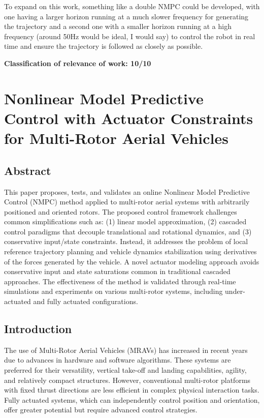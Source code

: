 \documentclass[a4paper,12pt]{article}
\begin{document}
To expand on this work, something like a double NMPC could be developed, with one having a larger horizon running at a much slower frequency for generating the trajectory and a second one with a smaller horizon running at a high frequency (around 50Hz would be ideal, I would say) to control the robot in real time and ensure the trajectory is followed as closely as possible.

\textbf{Classification of relevance of work: 10/10}

\clearpage

\section{Nonlinear Model Predictive Control with Actuator Constraints for Multi-Rotor Aerial Vehicles}

\subsection{Abstract}
This paper proposes, tests, and validates an online Nonlinear Model Predictive Control (NMPC) method applied to multi-rotor aerial systems with arbitrarily positioned and oriented rotors. The proposed control framework challenges common simplifications such as: (1) linear model approximation, (2) cascaded control paradigms that decouple translational and rotational dynamics, and (3) conservative input/state constraints. Instead, it addresses the problem of local reference trajectory planning and vehicle dynamics stabilization using derivatives of the forces generated by the vehicle. A novel actuator modeling approach avoids conservative input and state saturations common in traditional cascaded approaches. The effectiveness of the method is validated through real-time simulations and experiments on various multi-rotor systems, including under-actuated and fully actuated configurations.

\subsection{Introduction}
The use of Multi-Rotor Aerial Vehicles (MRAVs) has increased in recent years due to advances in hardware and software algorithms. These systems are preferred for their versatility, vertical take-off and landing capabilities, agility, and relatively compact structures. However, conventional multi-rotor platforms with fixed thrust directions are less efficient in complex physical interaction tasks. Fully actuated systems, which can independently control position and orientation, offer greater potential but require advanced control strategies.
\end{document}
